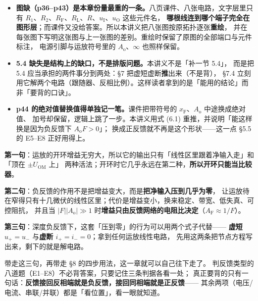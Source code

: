 \documentclass[11pt]{ctexart}
\begin{document}
\begin{itemize}
\item \textbf{图缺（p36--p43）是本章份量最重的一条。}八页课件、八张电路，文字层里只有
$R_1$、$R_2$、$R_{\mathrm{F}}$、$R_{\mathrm{L}}$、$R$、$u_{\mathrm{I}}$、$u_{\mathrm{O}}$ 这些元件名，
\textbf{哪根线连到哪个端子完全在图形层}；而课件又没给答案。所以本讲义把八张图按原拓扑逐张\textbf{重绘}，
并在每张图下写明这张图与上一张图的差别。重绘时保留了原图的全部端口与元件标注，
电源引脚与运放符号里的 $A_{\mathrm{o}}$、$\infty$ 也照样保留。
\item \textbf{5.4 缺失是结构上的缺口，不是排版问题。}本讲义不是「补一节 5.4」，
而是把 5.4 应当承担的两件事分到两处：§7 把虚短虚断\textbf{推}出来（不是背），
§7.4 立刻用它解两个电路（跟随器、反相比例）。这样读者拿到的是「能用的结论」而非「要背的口诀」。
\item \textbf{p44 的绝对值替换值得单独记一笔。}课件把带符号的 $x_{\mathrm{F}}$、$A_{\mathrm{o}}$ 中途换成绝对值、
加号却保留，逻辑上跳了一步。本讲义用式 (6.1) 重推，并说明「能这样换是因为负反馈下 $A_{\mathrm{o}}F>0$」；
换成正反馈就不再是这个形状——这一点 §5.5 的 E5--E8 正好用得上。
\end{itemize}


\begin{cbox}
\textbf{第一句}：运放的开环增益无穷大，所以它的输出只有「线性区里跟着净输入走」和「顶在 $\pm U_{\mathrm{OM}}$ 上」
两种活法；开环时它几乎永远在第二种，\textbf{所以开环只能当比较器}。

\textbf{第二句}：负反馈的作用不是把增益变大，而是\textbf{把净输入压到几乎为零}，
让运放待在窄得只有十几微伏的线性区里；代价是增益变小，换来稳定、带宽、低失真、可控阻抗，
并且当 $|F||A_{\mathrm{o}}|\gg1$ 时\textbf{增益只由反馈网络的电阻比决定}（$A_{\mathrm{F}}\approx1/F$）。

\textbf{第三句}：深度负反馈下，这套「压到零」的行为可以用两个式子代替——
\textbf{虚短 $u_+=u_-$} 与\textbf{虚断 $i_+=i_-=0$}；拿到任何运放线性电路，
先用这两条把节点方程写出来，剩下的就是解电路。
\end{cbox}

\flowerrule

带走这三句，再带走 §8 的四步用法，这一章就可以自己往下走了。
判反馈类型的八道题（E1--E8）不必背答案，只要记住三条判据各看一处；
真正要背的只有一句话：\textbf{反馈接回反相端就是负反馈，接回同相端就是正反馈}——
其余两项（电压/电流、串联/并联）都是「看位置」，看一眼就知道。
\end{document}
